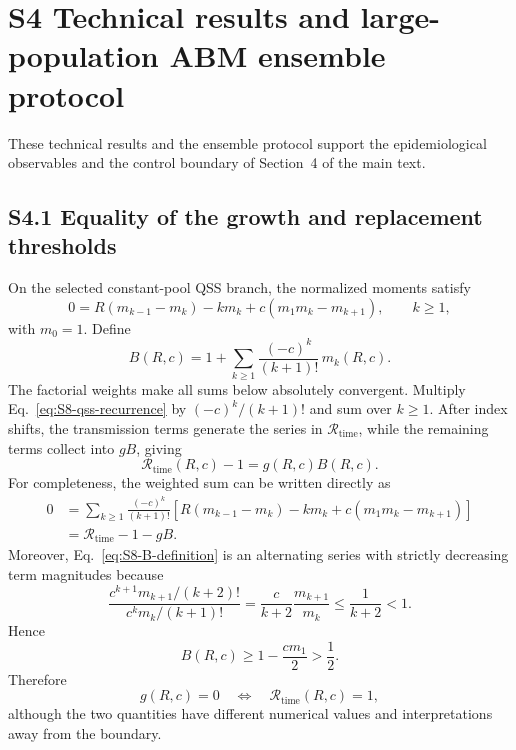 \documentclass[11pt]{article}
\begin{document}
\section*{S4 Technical results and large-population ABM ensemble protocol}
These technical results and the ensemble protocol support the epidemiological
observables and the control boundary of Section~4 of the main text.

\subsection*{S4.1 Equality of the growth and replacement thresholds}

On the selected constant-pool QSS branch, the normalized moments satisfy
\begin{equation}
0=R(m_{k-1}-m_k)-km_k+c(m_1m_k-m_{k+1}),
\qquad k\geq1,
\label{eq:S8-qss-recurrence}
\end{equation}
with $m_0=1$. Define
\begin{equation}
B(R,c)=1+\sum_{k\geq1}\frac{(-c)^k}{(k+1)!}\,m_k(R,c).
\label{eq:S8-B-definition}
\end{equation}
The factorial weights make all sums below absolutely convergent. Multiply Eq.~\eqref{eq:S8-qss-recurrence} by $(-c)^k/(k+1)!$ and sum over $k\geq1$. After index shifts, the transmission terms generate the series in $\mathcal R_{\mathrm{time}}$, while the remaining terms collect into $gB$, giving
\begin{equation}
\mathcal R_{\mathrm{time}}(R,c)-1
=g(R,c)B(R,c).
\label{eq:S8-threshold-identity}
\end{equation}
For completeness, the weighted sum can be written directly as
\begin{align}
0
&=\sum_{k\geq1}\frac{(-c)^k}{(k+1)!}
\left[R(m_{k-1}-m_k)-km_k+c(m_1m_k-m_{k+1})\right] \\
&=\mathcal R_{\mathrm{time}}-1-gB.
\label{eq:S8-weighted-sum}
\end{align}
Moreover, Eq.~\eqref{eq:S8-B-definition} is an alternating series with strictly decreasing term magnitudes because
\begin{equation}
\frac{c^{k+1}m_{k+1}/(k+2)!}{c^km_k/(k+1)!}
=\frac{c}{k+2}\frac{m_{k+1}}{m_k}
\leq\frac{1}{k+2}<1.
\end{equation}
Hence
\begin{equation}
B(R,c)\geq1-\frac{cm_1}{2}>\frac12.
\label{eq:S8-B-positive}
\end{equation}
Therefore
\begin{equation}
g(R,c)=0
\quad\Longleftrightarrow\quad
\mathcal R_{\mathrm{time}}(R,c)=1,
\label{eq:S8-threshold-equivalence}
\end{equation}
although the two quantities have different numerical values and interpretations away from the boundary.
\end{document}
